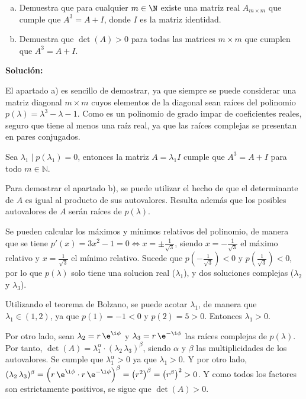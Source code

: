 \documentclass[../../main.tex]{subfiles}
\begin{document}
  \begin{shaded}
    \begin{enumerate}[a)]
      \item Demuestra que para cualquier $m \in \N$ existe una matriz real $A_{m \times m}$ que cumple que $A^3 = A + I$, donde $I$ es la matriz identidad.
      \item Demuestra que $\det{(A)} > 0$ para todas las matrices $m \times m$ que cumplen que $A^3 = A + I$.
    \end{enumerate}
  \end{shaded}

  \textbf{Solución:}

  El apartado a) es sencillo de demostrar, ya que siempre se puede considerar una matriz diagonal $m \times m$ cuyos elementos de la diagonal sean raíces del polinomio $p(\lambda) = \lambda^3 - \lambda - 1$. Como es un polinomio de grado impar de coeficientes reales, seguro que tiene al menos una raíz real, ya que las raíces complejas se presentan en pares conjugados.

  Sea $\lambda_1 \; | \; p(\lambda_1) = 0$, entonces la matriz $A = \lambda_1 I$ cumple que $A^3 = A + I$ para todo $m \in \mathbb{N}$.

  Para demostrar el apartado b), se puede utilizar el hecho de que el determinante de $A$ es igual al producto de sus autovalores. Resulta además que los posibles autovalores de $A$ serán raíces de $p(\lambda)$.

  Se pueden calcular los máximos y mínimos relativos del polinomio, de manera que se tiene $p'(x) = 3x^2 - 1 = 0 \iff x = \pm \displaystyle\frac{1}{\sqrt{3}}$, siendo $x = -\displaystyle\frac{1}{\sqrt{3}}$ el máximo relativo y $x = \displaystyle\frac{1}{\sqrt{3}}$ el mínimo relativo. Sucede que $p\left(-\displaystyle\frac{1}{\sqrt{3}}\right) < 0$ y $p\left(\displaystyle\frac{1}{\sqrt{3}}\right) < 0$, por lo que $p(\lambda)$ solo tiene una solucion real ($\lambda_1$), y dos soluciones complejas ($\lambda_2$ y $\lambda_3$).

  Utilizando el teorema de Bolzano, se puede acotar $\lambda_1$, de manera que $\lambda_1 \in (1, 2)$, ya que $p(1) = -1 < 0$ y $p(2) = 5 > 0$. Entonces $\lambda_1 > 0$.

  Por otro lado, sean $\lambda_2 = r \, \e^{\i\phi}$ y $\lambda_3 = r \, \e^{-\i\phi}$ las raíces complejas de $p(\lambda)$. Por tanto, $\det{(A)} = \lambda_1^\alpha \cdot (\lambda_2 \, \lambda_3)^\beta$, siendo $\alpha$ y $\beta$ las multiplicidades de los autovalores. Se cumple que $\lambda_1^\alpha > 0$ ya que $\lambda_1 > 0$. Y por otro lado, $(\lambda_2 \, \lambda_3)^\beta = \left(r \, \e^{\i\phi} \cdot r \, \e^{-\i\phi} \right)^\beta = \left(r^2\right)^\beta = \left(r^\beta\right)^2 > 0$. Y como todos los factores son estrictamente positivos, se sigue que $\det{(A)} > 0$.
\end{document}
